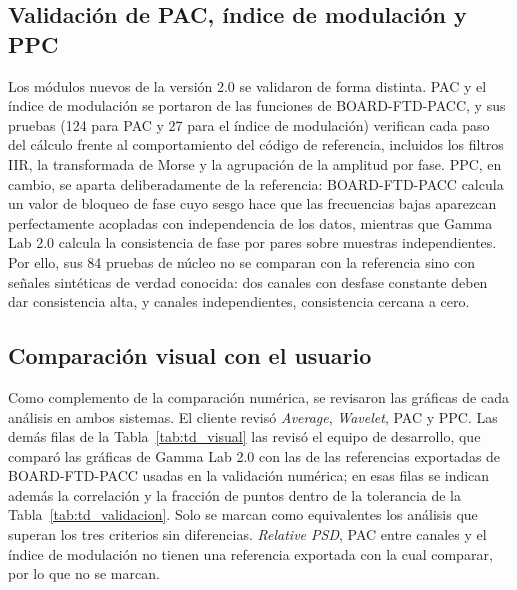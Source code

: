 \documentclass[12pt,letterpaper,oneside]{article}
\DeclareRobustCommand{\_}{\textunderscore\allowbreak}
\begin{document}
\subsection{Validación de PAC, índice de modulación y PPC}
Los módulos nuevos de la versión 2.0 se validaron de forma distinta. PAC y el índice de modulación se portaron de las funciones de BOARD-FTD-PACC, y sus pruebas (124 para PAC y 27 para el índice de modulación) verifican cada paso del cálculo frente al comportamiento del código de referencia, incluidos los filtros IIR, la transformada de Morse y la agrupación de la amplitud por fase. PPC, en cambio, se aparta deliberadamente de la referencia: BOARD-FTD-PACC calcula un valor de bloqueo de fase cuyo sesgo hace que las frecuencias bajas aparezcan perfectamente acopladas con independencia de los datos, mientras que Gamma Lab 2.0 calcula la consistencia de fase por pares sobre muestras independientes. Por ello, sus 84 pruebas de núcleo no se comparan con la referencia sino con señales sintéticas de verdad conocida: dos canales con desfase constante deben dar consistencia alta, y canales independientes, consistencia cercana a cero.

\subsection{Comparación visual con el usuario}
Como complemento de la comparación numérica, se revisaron las gráficas de cada análisis en ambos sistemas. El cliente revisó \textit{Average}, \textit{Wavelet}, PAC y PPC. Las demás filas de la Tabla~\ref{tab:td_visual} las revisó el equipo de desarrollo, que comparó las gráficas de Gamma Lab 2.0 con las de las referencias exportadas de BOARD-FTD-PACC usadas en la validación numérica; en esas filas se indican además la correlación y la fracción de puntos dentro de la tolerancia de la Tabla~\ref{tab:td_validacion}. Solo se marcan como equivalentes los análisis que superan los tres criterios sin diferencias. \textit{Relative PSD}, PAC entre canales y el índice de modulación no tienen una referencia exportada con la cual comparar, por lo que no se marcan.
\end{document}

